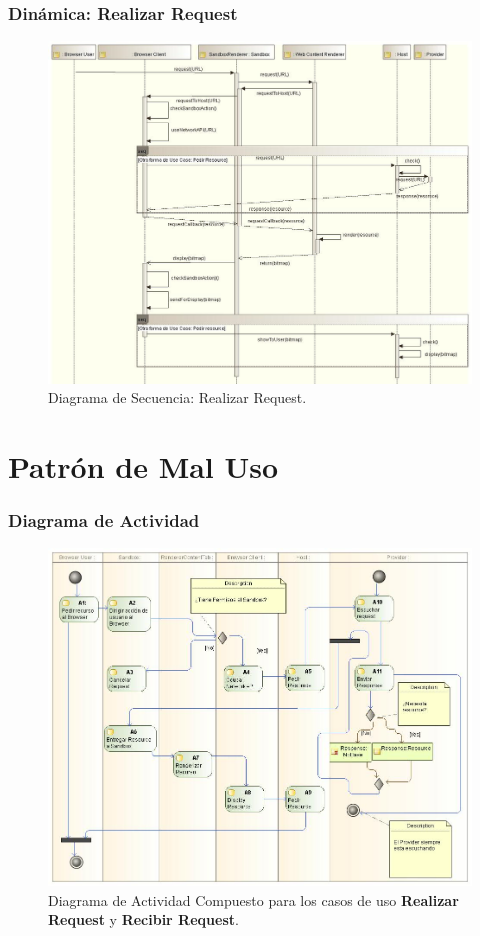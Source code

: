 \documentclass[serif,9pt]{beamer}
\begin{document}
\begin{frame}
	\frametitle{Din\'amica: Realizar Request}
	\begin{figure}[h]
	    \centering
	    \includegraphics[scale=0.28]{figures/chap4/requestResource_v2.jpg}
	    \caption{Diagrama de Secuencia: Realizar Request.}
	    \label{fig:SecReq}
	\end{figure}
\end{frame}

\section{Patr\'on de Mal Uso}
\begin{frame}
	\frametitle{Diagrama de Actividad}
	\begin{figure}[h]
	    \centering
	    \includegraphics[scale=0.23]{figures/chap5/activityDiag_v3.jpg}
	    \caption{Diagrama de Actividad Compuesto para los casos de uso \textbf{Realizar Request} y \textbf{Recibir Request}.}
	    \label{fig:ActDiagr}
	\end{figure}
\end{frame}
\end{document}
